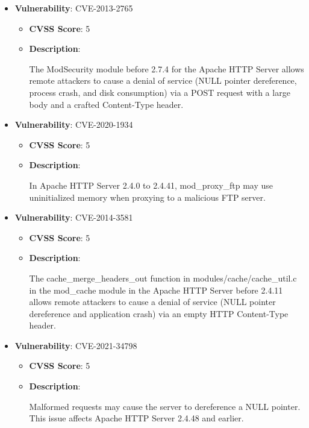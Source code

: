 \documentclass{article}
\begin{document}
\begin{itemize}
        \item \textbf{Vulnerability}: CVE-2013-2765
        \begin{itemize}
            \item \textbf{CVSS Score}:  5 
            \item \textbf{Description}:
            \parbox[t]{0.9\linewidth}{
                \ttfamily The ModSecurity module before 2.7.4 for the Apache HTTP Server allows remote attackers to cause a denial of service (NULL pointer dereference, process crash, and disk consumption) via a POST request with a large body and a crafted Content-Type header.
            }
        \end{itemize}
    
        \item \textbf{Vulnerability}: CVE-2020-1934
        \begin{itemize}
            \item \textbf{CVSS Score}:  5 
            \item \textbf{Description}:
            \parbox[t]{0.9\linewidth}{
                \ttfamily In Apache HTTP Server 2.4.0 to 2.4.41, mod\_proxy\_ftp may use uninitialized memory when proxying to a malicious FTP server.
            }
        \end{itemize}
    
        \item \textbf{Vulnerability}: CVE-2014-3581
        \begin{itemize}
            \item \textbf{CVSS Score}:  5 
            \item \textbf{Description}:
            \parbox[t]{0.9\linewidth}{
                \ttfamily The cache\_merge\_headers\_out function in modules/cache/cache\_util.c in the mod\_cache module in the Apache HTTP Server before 2.4.11 allows remote attackers to cause a denial of service (NULL pointer dereference and application crash) via an empty HTTP Content-Type header.
            }
        \end{itemize}
    
        \item \textbf{Vulnerability}: CVE-2021-34798
        \begin{itemize}
            \item \textbf{CVSS Score}:  5 
            \item \textbf{Description}:
            \parbox[t]{0.9\linewidth}{
                \ttfamily Malformed requests may cause the server to dereference a NULL pointer. This issue affects Apache HTTP Server 2.4.48 and earlier.
            }
        \end{itemize}
    

\end{itemize}
\end{document}
